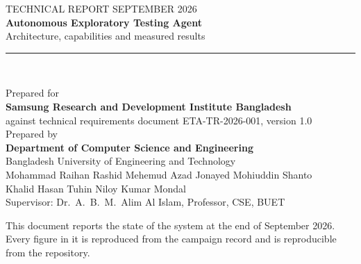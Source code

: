 \documentclass[11pt,a4paper]{article}
\begin{document}
\thispagestyle{empty}
\begin{center}
  \vspace*{22mm}
  {\color{sGrey}\footnotesize TECHNICAL REPORT\,\textbar\,SEPTEMBER 2026}\\[10mm]
  {\LARGE\bfseries\color{sRule} Autonomous Exploratory Testing Agent}\\[5mm]
  {\large Architecture, capabilities and measured results}\\[14mm]
  {\color{sRule}\rule{0.55\textwidth}{0.8pt}}\\[10mm]
  \begin{minipage}{0.8\textwidth}\centering
    \small
    Prepared for\\[2pt]
    {\bfseries Samsung Research and Development Institute Bangladesh}\\[3pt]
    against technical requirements document ETA-TR-2026-001, version 1.0\\[12mm]
    Prepared by\\[2pt]
    {\bfseries Department of Computer Science and Engineering}\\
    Bangladesh University of Engineering and Technology\\[6mm]
    Mohammad Raihan Rashid \quad Mehemud Azad \quad Jonayed Mohiuddin Shanto\\
    Khalid Hasan Tuhin \quad Niloy Kumar Mondal\\[6mm]
    Supervisor: Dr.\ A.\ B.\ M.\ Alim Al Islam, Professor, CSE, BUET
  \end{minipage}
\end{center}
\vfill
\begin{center}\footnotesize\color{sGrey}
  This document reports the state of the system at the end of September 2026.\\
  Every figure in it is reproduced from the campaign record and is reproducible from the repository.
\end{center}
\clearpage

\tableofcontents
\clearpage











\end{document}
